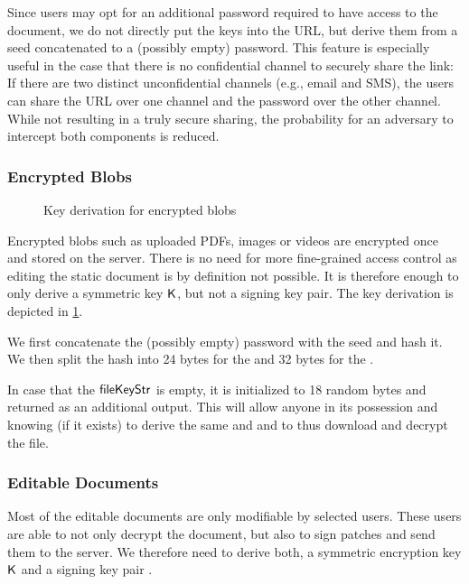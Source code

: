 Since users may opt for an additional password required to have access to the document, we do not directly put the keys into the URL, but derive them from a seed concatenated to a (possibly empty) password.
This feature is especially useful in the case that there is no confidential channel to securely share the link:
If there are two distinct unconfidential channels (e.g., email and SMS), the users can share the URL over one channel and the password over the other channel.
While not resulting in a truly secure sharing, the probability for an adversary to intercept both components is reduced.

\subsubsection{Encrypted Blobs}
\label{sec:static_pads}

\begin{figure}[t!]
  \centering
  
  \caption{Key derivation for encrypted blobs}
  \label{fig:filecryptor2}
\end{figure}

Encrypted blobs such as uploaded PDFs, images or videos are encrypted once and stored on the server.
There is no need for more fine-grained access control as editing the static document is by definition not possible.
It is therefore enough to only derive a symmetric key $\mySymKey$, but not a signing key pair.
The key derivation is depicted in \cref{fig:filecryptor2}.

We first concatenate the (possibly empty) password \mypwd with the seed \myFileKeyStr and hash it.
We then split the hash into 24 bytes for the \mychanID and 32 bytes for the \mySymKey.

In case that the $\myFileKeyStr$ is empty, it is initialized to 18 random bytes and returned as an additional output.
This will allow anyone in its possession and knowing \mypwd (if it exists) to derive the same \mychanID and \mySymKey and to thus download and decrypt the file.

\subsubsection{Editable Documents}
\label{sec:read_write}
Most of the editable documents are only modifiable by selected users.
These users are able to not only decrypt the document, but also to sign patches and send them to the server.
We therefore need to derive both, a symmetric encryption key $\mySymKey$ and a signing key pair \myKeyPair{}.

